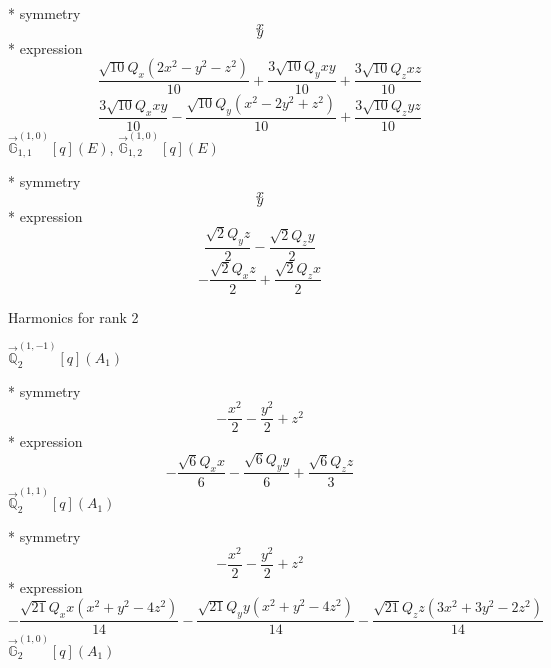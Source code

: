 \documentclass[fleqn,8pt]{jsarticle}
\begin{document}
\noindent\quad ** symmetry
\begin{dmath*}
x
\end{dmath*}
\begin{dmath*}
y
\end{dmath*}
\noindent\quad ** expression
\begin{dmath*}
\frac{\sqrt{10} Q_{x} \left(2 x^{2} - y^{2} - z^{2}\right)}{10} + \frac{3 \sqrt{10} Q_{y} x y}{10} + \frac{3 \sqrt{10} Q_{z} x z}{10}
\end{dmath*}
\begin{dmath*}
\frac{3 \sqrt{10} Q_{x} x y}{10} - \frac{\sqrt{10} Q_{y} \left(x^{2} - 2 y^{2} + z^{2}\right)}{10} + \frac{3 \sqrt{10} Q_{z} y z}{10}
\end{dmath*}
\noindent\quad $\vec{\mathbb{G}}_{1,1}^{(1,0)}[q](E)$, $\vec{\mathbb{G}}_{1,2}^{(1,0)}[q](E)$

\noindent\quad ** symmetry
\begin{dmath*}
x
\end{dmath*}
\begin{dmath*}
y
\end{dmath*}
\noindent\quad ** expression
\begin{dmath*}
\frac{\sqrt{2} Q_{y} z}{2} - \frac{\sqrt{2} Q_{z} y}{2}
\end{dmath*}
\begin{dmath*}
- \frac{\sqrt{2} Q_{x} z}{2} + \frac{\sqrt{2} Q_{z} x}{2}
\end{dmath*}

\noindent * Harmonics for rank 2

\noindent\quad $\vec{\mathbb{Q}}_{2}^{(1,-1)}[q](A_{1})$

\noindent\quad ** symmetry
\begin{dmath*}
- \frac{x^{2}}{2} - \frac{y^{2}}{2} + z^{2}
\end{dmath*}
\noindent\quad ** expression
\begin{dmath*}
- \frac{\sqrt{6} Q_{x} x}{6} - \frac{\sqrt{6} Q_{y} y}{6} + \frac{\sqrt{6} Q_{z} z}{3}
\end{dmath*}
\noindent\quad $\vec{\mathbb{Q}}_{2}^{(1,1)}[q](A_{1})$

\noindent\quad ** symmetry
\begin{dmath*}
- \frac{x^{2}}{2} - \frac{y^{2}}{2} + z^{2}
\end{dmath*}
\noindent\quad ** expression
\begin{dmath*}
- \frac{\sqrt{21} Q_{x} x \left(x^{2} + y^{2} - 4 z^{2}\right)}{14} - \frac{\sqrt{21} Q_{y} y \left(x^{2} + y^{2} - 4 z^{2}\right)}{14} - \frac{\sqrt{21} Q_{z} z \left(3 x^{2} + 3 y^{2} - 2 z^{2}\right)}{14}
\end{dmath*}
\noindent\quad $\vec{\mathbb{G}}_{2}^{(1,0)}[q](A_{1})$
\end{document}
